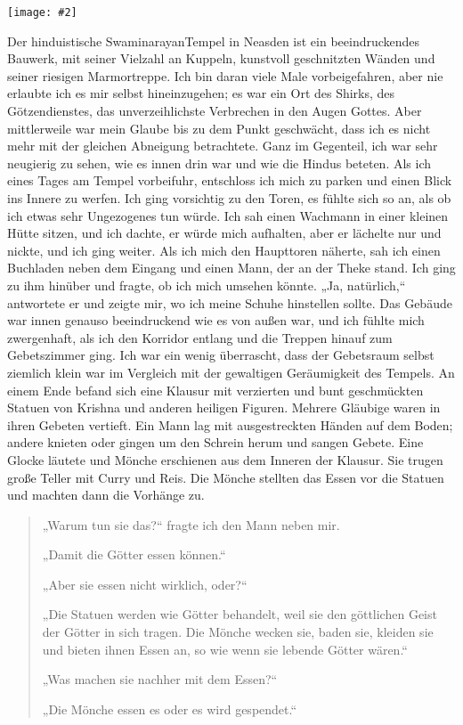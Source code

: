 \documentclass[12pt]{memoir}
\newcommand{\img}[3]{\begin{center}%
\texttt{[image: \#2]}\\{\small\em#3}%
\end{center}}
\begin{document}
\img{scale=0.6}{Neasden_Temple.jpg}{}

Der hinduistische Swaminarayan\–Tempel in Neasden
ist ein beeindruckendes Bauwerk, mit seiner Vielzahl an Kuppeln,
kunstvoll geschnitzten Wänden und seiner riesigen Marmortreppe.
Ich bin daran viele Male vorbeigefahren,
aber nie erlaubte ich es mir selbst hineinzugehen;
es war ein Ort des Shirks, des Götzendienstes,
das unverzeihlichste Verbrechen in den Augen Gottes.
Aber mittlerweile war mein Glaube bis zu dem Punkt geschwächt,
dass ich es nicht mehr mit der gleichen Abneigung betrachtete.
Ganz im Gegenteil, ich war sehr neugierig zu sehen,
wie es innen drin war und wie die Hindus beteten.
Als ich eines Tages am Tempel vorbeifuhr, entschloss ich mich
zu parken und einen Blick ins Innere zu werfen.
Ich ging vorsichtig zu den Toren, es fühlte sich so an,
als ob ich etwas sehr Ungezogenes tun würde.
Ich sah einen Wachmann in einer kleinen Hütte sitzen, und ich dachte,
er würde mich aufhalten, aber er lächelte nur und nickte, und ich ging weiter.
Als ich mich den Haupttoren näherte,
sah ich einen Buchladen neben dem Eingang
und einen Mann, der an der Theke stand.
Ich ging zu ihm hinüber und fragte, ob ich mich umsehen könnte.
„Ja, natürlich,“ antwortete er und zeigte mir,
wo ich meine Schuhe hinstellen sollte.
Das Gebäude war innen genauso beeindruckend
wie es von außen war, und ich fühlte mich zwergenhaft,
als ich den Korridor entlang und die Treppen hinauf zum Gebetszimmer ging.
Ich war ein wenig überrascht, dass der Gebetsraum selbst
ziemlich klein war im Vergleich mit der gewaltigen Geräumigkeit des Tempels.
An einem Ende befand sich eine Klausur mit verzierten
und bunt geschmückten Statuen von Krishna und anderen heiligen Figuren.
Mehrere Gläubige waren in ihren Gebeten vertieft.
Ein Mann lag mit ausgestreckten Händen auf dem Boden;
andere knieten oder gingen um den Schrein herum und sangen Gebete.
Eine Glocke läutete und Mönche erschienen aus dem Inneren der Klausur.
Sie trugen große Teller mit Curry und Reis.
Die Mönche stellten das Essen vor die Statuen
und machten dann die Vorhänge zu.

\begin{quote}
„Warum tun sie das?“ fragte ich den Mann neben mir.

„Damit die Götter essen können.“

„Aber sie essen nicht wirklich, oder?“

„Die Statuen werden wie Götter behandelt,
weil sie den göttlichen Geist der Götter in sich tragen.
Die Mönche wecken sie, baden sie, kleiden sie und bieten ihnen Essen an,
so wie wenn sie lebende Götter wären.“

„Was machen sie nachher mit dem Essen?“

„Die Mönche essen es oder es wird gespendet.“
\end{quote}
\end{document}
